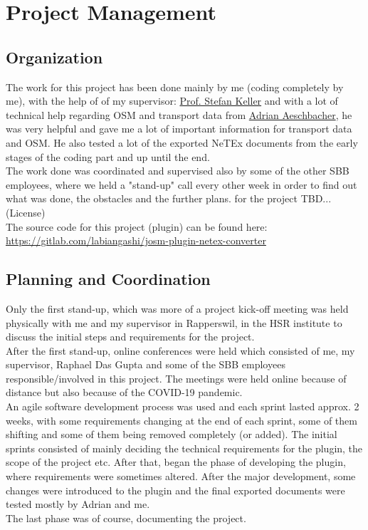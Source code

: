 \chapter{Project Management}
\section{Organization}
The work for this project has been done mainly by me (coding completely by me), with the help of of my supervisor: \href{mailto:stefan.keller@hsr.ch}{Prof. Stefan Keller} and with a lot of technical help regarding OSM and transport data from \href{mailto:adrian.aeschbacher2@sbb.ch}{Adrian Aeschbacher}, he was very helpful and gave me a lot of important information for transport data and OSM. He also tested a lot of the exported NeTEx documents from the early stages of the coding part and up until the end.\\
\newline
The work done was coordinated and supervised also by some of the other SBB employees, where we held a "stand-up" call every other week in order to find out what was done, the obstacles and the further plans. for the project
TBD...(License)\\
\newline
The source code for this project (plugin) can be found here:\\ \href{https://gitlab.com/labiangashi/josm-plugin-netex-converter}{https://gitlab.com/labiangashi/josm-plugin-netex-converter}
\section{Planning and Coordination}
Only the first stand-up, which was more of a project kick-off meeting was held physically with me and my supervisor in Rapperswil, in the HSR institute to discuss the initial steps and requirements for the project.\\
After the first stand-up, online conferences were held which consisted of me, my supervisor, Raphael Das Gupta and some of the SBB employees responsible/involved in this project. The meetings were held online because of distance but also because of the COVID-19 pandemic.\\
An agile software development process was used and each sprint lasted approx. 2 weeks, with some requirements changing at the end of each sprint, some of them shifting and some of them being removed completely (or added). The initial sprints consisted of mainly deciding the technical requirements for the plugin, the scope of the project etc. After that, began the phase of developing the plugin, where requirements were sometimes altered. After the major development, some changes were introduced to the plugin and the final exported documents were tested mostly by Adrian and me.\\
The last phase was of course, documenting the project.
